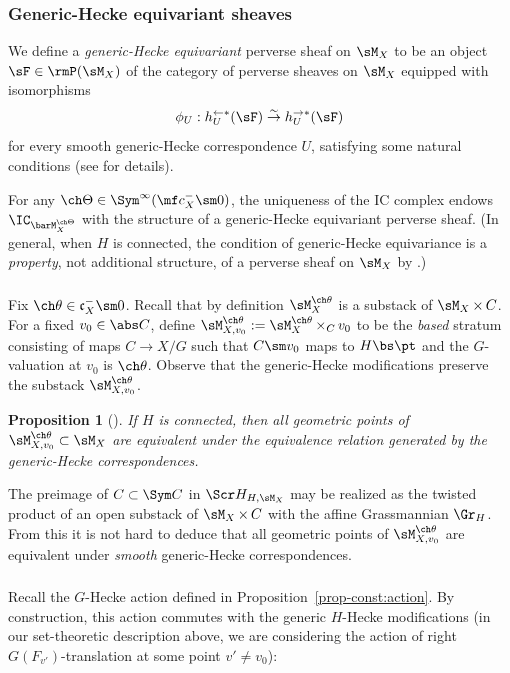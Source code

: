 \documentclass[final]{amsart}
\newtheorem{prop}[subsubsection]{Proposition}
\theoremstyle{remark}
\theoremstyle{definition}
\DeclareMathOperator*{\xt}{\times}
\numberwithin{equation}{section}
\begin{document}
\subsubsection{Generic-Hecke equivariant sheaves}
We define a \emph{generic-Hecke equivariant} perverse sheaf on $\sM_X$ 
to be an object $\sF \in \rmP(\sM_X)$ of the category of perverse sheaves on $\sM_X$
equipped with isomorphisms 
\[ \phi_U : h^{\leftarrow *}_U(\sF) \overset\sim\to h_U^{\rightarrow *}(\sF) 
\] 
for every smooth generic-Hecke correspondence $U$, satisfying some natural 
conditions (see \cite[\S 2.3]{GN} for details).

For any $\ch\Theta \in \Sym^\infty(\mf c_X^- \sm 0)$, 
the uniqueness of the IC complex endows $\IC_{\barM^{\ch\Theta}_X}$ 
with the structure of a generic-Hecke equivariant perverse sheaf. 
(In general, when $H$ is connected, the condition of generic-Hecke equivariance
is a \emph{property}, not additional structure, of a perverse sheaf on $\sM_X$
by \cite[Proposition 3.5.2]{GN}.)

\subsubsection{}
Fix $\ch\theta \in \mathfrak c_X^- \sm 0$. 
Recall that by definition $\sM_X^{\ch\theta}$ is a substack of $\sM_X \xt C$. 
For a fixed $v_0 \in \abs C$, define $\sM_{X,v_0}^{\ch\theta} := \sM_X^{\ch\theta} \xt_C v_0$
to be the \emph{based} stratum consisting of maps $C \to X/G$ such that $C\sm v_0$
maps to $H\bs \pt$ and the $G$-valuation at $v_0$ is $\ch\theta$.
Observe that the generic-Hecke modifications preserve the substack
$\sM_{X,v_0}^{\ch\theta}$. 

\begin{prop}[{\cite[Proposition 3.5.1]{GN}}] 
\label{prop:genHecke-transitive}
If $H$ is connected, then all geometric points of $\sM_{X,v_0}^{\ch\theta} \subset \sM_X$
are equivalent under the equivalence relation generated by 
the generic-Hecke correspondences. 
\end{prop}

The preimage of $C\subset \Sym C$ in $\Scr H_{H,\sM_X}$ may be realized as the
twisted product of an open substack of $\sM_X \xt C$ with the affine Grassmannian
$\Gr_H$. From this it is not hard to deduce that all geometric points of 
$\sM_{X,v_0}^{\ch\theta}$ are equivalent under \emph{smooth} generic-Hecke correspondences. 

\subsubsection{} 
Recall the $G$-Hecke action defined in Proposition~\ref{prop-const:action}. 
By construction, this action commutes with the generic $H$-Hecke modifications (in 
our set-theoretic description above, we are considering the action of right
$G(F_{v'})$-translation at some point $v' \ne v_0$):
\end{document}
